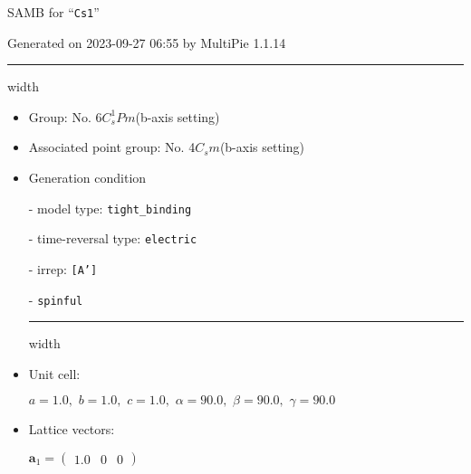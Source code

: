 \documentclass[fleqn,10pt,landscape]{article}
\begin{document}
\setcounter{MaxMatrixCols}{16}

\setlength{\baselineskip}{16pt}
\footnotesize
\begin{center}
\LARGE
SAMB for ``\texttt{Cs1}''
\end{center}
\begin{flushright}
Generated on 2023-09-27 06:55 by MultiPie 1.1.14
\end{flushright}
\vspace{1cm}


 \hfil \hrule height 1mm width \textwidth \hfil

\begin{itemize}
\item Group: No. 6\quad$C_{s}^{1}$\quad$Pm$\quad(b-axis setting)\quad[ monoclinic ]

\item Associated point group: No. 4\quad$C_{s}$\quad$m$\quad(b-axis setting)\quad[ monoclinic ]

\vspace{5mm}

\item Generation condition

\quad - model type: \texttt{tight_binding}

\quad - time-reversal type: \texttt{electric}

\quad - irrep: \texttt{[A']}

\quad - \texttt{spinful}


 \hfil \hrule height 1mm width \textwidth \hfil

\item Unit cell:

\quad $a=1.0,\,\, b=1.0,\,\, c=1.0,\,\, \alpha=90.0,\,\, \beta=90.0,\,\, \gamma=90.0$

\item Lattice vectors:

\quad $\bm{a}_1=\begin{pmatrix} 1.0 & 0 & 0 \end{pmatrix}$


\end{itemize}
\end{document}
